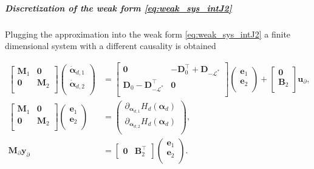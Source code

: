 \subparagraph{Discretization of the weak form \eqref{eq:weak_sys_intJ2}}
Plugging the approximation into the weak form \eqref{eq:weak_sys_intJ2} a finite dimensional system with a different causality is obtained

\begin{equation}\label{eq:pHsys_findim_J2}
\begin{aligned}
\begin{bmatrix}
\mathbf{M}_1 & \mathbf{0} \\
\mathbf{0} & \mathbf{M}_2 \\
\end{bmatrix}
\begin{pmatrix}
\dot{\bm{\alpha}}_{d, 1} \\
\dot{\bm{\alpha}}_{d, 2} \\
\end{pmatrix}
&= \begin{bmatrix}
\mathbf{0} & -\mathbf{D}_{0}^\top + \mathbf{D}_{-\mathcal{L}^*} \\
\mathbf{D}_{0} - \mathbf{D}_{-\mathcal{L}^*}^\top & \mathbf{0} \\
\end{bmatrix} 
\begin{pmatrix}
\mathbf{e}_{1} \\
\mathbf{e}_{2} \\
\end{pmatrix} + 
\begin{bmatrix}
\mathbf{0}\\
\mathbf{B}_2\\
\end{bmatrix}
\mathbf{u}_\partial, \\
\begin{bmatrix}
\mathbf{M}_1 & \mathbf{0} \\
\mathbf{0} & \mathbf{M}_2 \\
\end{bmatrix}
\begin{pmatrix}
\mathbf{e}_{1} \\
\mathbf{e}_{2} \\
\end{pmatrix}
&= \begin{pmatrix}
\partial_{\bm{\alpha}_{d, 1}} H_d(\bm{\alpha}_d)\\
\partial_{\bm{\alpha}_{d, 2}} H_d(\bm{\alpha}_d)\\
\end{pmatrix}, \\
\mathbf{M}_\partial {\mathbf{y}_\partial} &= 
\begin{bmatrix}
\mathbf{0} & \mathbf{B}_2^\top 
\end{bmatrix}\begin{pmatrix}
\mathbf{e}_{1} \\
\mathbf{e}_{2} \\
\end{pmatrix}.
\end{aligned}
\end{equation}
